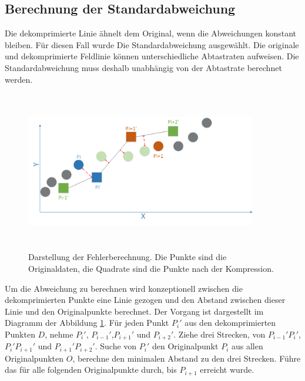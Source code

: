 \subsection{Berechnung der Standardabweichung}\label{testsetup:ablauf}
Die dekomprimierte Linie ähnelt dem Original, wenn die Abweichungen konstant bleiben. Für diesen Fall wurde Die Standardabweichung ausgewählt. Die originale und dekomprimierte Feldlinie können unterschiedliche Abtastraten aufweisen. Die Standardabweichung muss deshalb unabhängig von der Abtastrate berechnet werden.

\begin{figure}[!htbp]
	\center
	\includegraphics[width=0.9\textwidth,height=7cm,keepaspectratio]{./pictures/testsetup/errorcalc.png}
	\caption{Darstellung der Fehlerberechnung. Die Punkte sind die Originaldaten, die Quadrate sind die Punkte nach der Kompression.}
	\label{testsetup:ablauf:fehlerberechnung:diagramm}
\end{figure} 
Um die Abweichung zu berechnen wird konzeptionell zwischen die dekomprimierten Punkte eine Linie gezogen und den Abstand zwischen dieser Linie und den Originalpunkte berechnet. Der Vorgang ist dargestellt im Diagramm der Abbildung \ref{testsetup:ablauf:fehlerberechnung:diagramm}. Für jeden Punkt $P_i'$ aus den dekomprimierten Punkten $D$, nehme $P_i'$, $P_{i-1}'$,$P_{i+1}'$ und $P_{i+2}'$. Ziehe drei Strecken, von $P_{i-1}'P_i'$, $P_{i}'P_{i+1}'$ und $P_{i+1}'P_{i+2}'$. Suche von $P_i'$ den Originalpunkt $P_i$ aus allen Originalpunkten $O$, berechne den minimalen Abstand zu den drei Strecken. Führe das für alle folgenden Originalpunkte durch, bis $P_{i+1}$ erreicht wurde.

